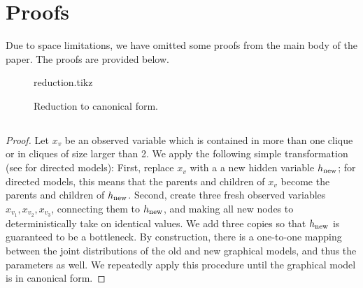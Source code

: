 \section{Proofs}
\label{app:proofs}

Due to space limitations, we have omitted some proofs from
the main body of the paper.  The proofs are provided below.

\begin{figure}
  \centering
  {reduction.tikz}
  \caption{Reduction to canonical form.}
  \label{fig:reduction}
\end{figure}

\subsection{}
\label{app:reduction-proof}
\begin{proof}
  \providecommand{\hp}{\ensuremath{h_\text{\rm new}}}
  Let $x_v$ be an observed variable which is contained in more than one clique
  or in cliques of size larger than 2.
  We apply the following simple transformation (see  for directed models):
  First, replace $x_v$ with a a new hidden variable \hp;
  for directed models, this means that the parents and children of $x_v$ become the parents and children of $\hp$.
  Second, create three fresh observed variables
  $x_{v_1},x_{v_2},x_{v_3}$, connecting them to $\hp$,
  and making all new nodes to deterministically take on identical values.
  We add three copies so that $\hp$ is guaranteed to be a bottleneck.
  By construction, there is a one-to-one mapping between the joint distributions
  of the old and new graphical models, and thus the parameters as well.
  We repeatedly apply this procedure until the graphical model is in canonical form.
\end{proof}


